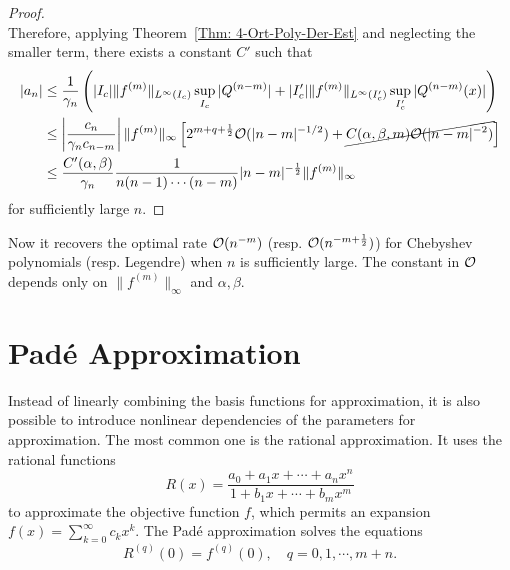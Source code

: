 \begin{proof}
\begin{equation}
    \end{equation}
    Therefore, applying Theorem~\ref{Thm: 4-Ort-Poly-Der-Est} and neglecting the smaller term, there exists a constant $C'$ such that
    \begin{equation}
    \begin{aligned}
    |a_n| &\le \frac{1}{\gamma_n}  \left( |I_c|\|f^{(m)}\|_{L^{\infty}(I_c)} \sup_{I_c} |Q^{(n-m)}| + |I_c'|\|f^{(m)}\|_{L^{\infty}(I_c')} \sup_{I_c'} |Q^{(n-m)}(x)| \right) \\
    &\le\left| \frac{c_n}{\gamma_n c_{n-m}} \right|\|f^{(m)}\|_{\infty} \left[  2^{m+q+\frac{1}{2}}\mathcal O(|n-m|^{-1/2})   + \cancel{C(\alpha,\beta, m)\mathcal O(|n-m|^{-2})}\right]\\
    &\le \frac{C'(\alpha, \beta)}{\gamma_n} \frac{1}{n(n-1)\cdots (n-m)}|n-m|^{-\frac{1}{2}} \|f^{(m)}\|_{\infty}
    \end{aligned}
    \end{equation}
    for sufficiently large $n$. 
\end{proof}
\begin{remark}
    Now it recovers the optimal rate $\mathcal O(n^{-m})$ (resp. $\mathcal O(n^{-m+\frac{1}{2}})$) for Chebyshev polynomials (resp. Legendre) when $n$ is sufficiently large. The constant in $\mathcal O$ depends only on $\|f^{(m)}\|_{\infty}$ and $\alpha, \beta$.
\end{remark}

\section{Pad\'e Approximation}
Instead of linearly combining the basis functions for approximation, it is also possible to introduce nonlinear dependencies of the parameters for approximation. The most common one is the rational approximation. It uses the rational functions 
\begin{equation}
    R(x) = \frac{a_0 + a_1 x + \cdots + a_n x^n}{1 + b_1 x + \cdots + b_m x^m}
\end{equation}
to approximate the objective function $f$, which permits an expansion $f(x) = \sum_{k=0}^{\infty} c_k x^k$. The Pad\'e approximation solves the equations 
\begin{equation}
    R^{(q)}(0) = f^{(q)}(0),\quad q = 0, 1, \cdots, m+n.
\end{equation}
\begin{lemma}
    
\end{lemma}

